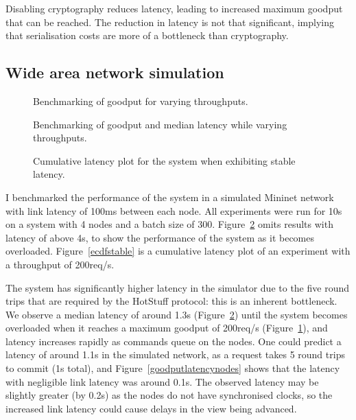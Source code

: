 Disabling cryptography reduces latency, leading to increased maximum goodput that can be reached. The reduction in latency is not that significant, implying that serialisation costs are more of a bottleneck than cryptography.

\subsection{Wide area network simulation} \label{minineteval}

\begin{figure}[h!]
\centering
\resizebox{.6\textwidth}{!}{}
\caption{Benchmarking of goodput for varying throughputs.}
\label{throughoutgoodputmininet}
\end{figure}

\begin{figure}[h!]
\centering
\resizebox{.5\textwidth}{!}{}
\caption{Benchmarking of goodput and median latency while varying throughputs.}
\label{goodputlatencymininet}
\end{figure}

\begin{figure}[h!]
\centering
\resizebox{.6\textwidth}{!}{}
\caption{Cumulative latency plot for the system when exhibiting stable latency.}
\label{ecdfmininet}
\end{figure}

I benchmarked the performance of the system in a simulated Mininet network \cite{mininet,lantzNetworkLaptopRapid2010} with link latency of 100ms between each node. All experiments were run for 10s on a system with 4 nodes and a batch size of 300. Figure~\ref{goodputlatencymininet} omits results with latency of above 4s, to show the performance of the system as it becomes overloaded. Figure~\ref{ecdfstable} is a cumulative latency plot of an experiment with a throughput of 200req/s.

The system has significantly higher latency in the simulator due to the five round trips that are required by the HotStuff protocol: this is an inherent bottleneck. We observe a median latency of around 1.3s (Figure~\ref{goodputlatencymininet}) until the system becomes overloaded when it reaches a maximum goodput of 200req/s (Figure~\ref{throughoutgoodputmininet}), and latency increases rapidly as commands queue on the nodes. One could predict a latency of around 1.1s in the simulated network, as a request takes 5 round trips to commit (1s total), and Figure~\ref{goodputlatencynodes} shows that the latency with negligible link latency was around 0.1s. The observed latency may be slightly greater (by 0.2s) as the nodes do not have synchronised clocks, so the increased link latency could cause delays in the view being advanced.

